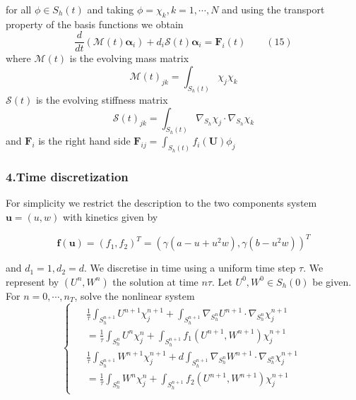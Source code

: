 \documentclass[notheorems,serif]{beamer}
\begin{document}
\begin{frame}
for all $\phi\in S_h(t)$ and taking $\phi=\chi_k, k=1,\cdots, N$ and using the transport property of the basis functions we obtain
\begin{equation*}
\frac{d}{dt}(\mathcal{M}(t)\boldsymbol{\alpha}_i)+d_i\mathcal{S}(t)\boldsymbol{\alpha}_i=\boldsymbol{F}_i(t)\qquad(15)
\end{equation*}
where $\mathcal{M}(t)$ is the evolving mass matrix
\begin{equation*}
\mathcal{M}(t)_{jk}=\int_{S_h(t)}\chi_j\chi_k
\end{equation*}
$\mathcal{S}(t)$ is the evolving stiffness matrix
\begin{equation*}
\mathcal{S}(t)_{jk}=\int_{S_h(t)}\nabla_{S_h}\chi_j\cdot\nabla_{S_h}\chi_k
\end{equation*}
and $\boldsymbol{F}_i$ is the right hand side $\boldsymbol{F}_{ij}=\int_{S_h(t)}f_i(\boldsymbol{U})\phi_j$
\end{frame}

\begin{frame}
\frametitle{\small 4.Time discretization}
For simplicity we restrict the description to the two components system $\boldsymbol{u}=(u, w)$ with kinetics given by 

\begin{equation*}
    \boldsymbol{f}(\boldsymbol{u})=(f_1, f_2)^T=\left(\gamma(a-u+u^2w),\gamma(b-u^2w)\right)^T
\end{equation*}

and $d_1=1, d_2=d$. We discretise in time using a uniform time step $\tau$. We represent by $(U^n, W^n)$ the solution at time $n\tau$. Let $U^0, W^0\in S_h(0)$ be given. For $n=0,\cdots,n_T$, solve the nonlinear system
\begin{equation*}
\begin{cases}
\begin{aligned}
&\frac{1}{\tau}\int_{S_h^{n+1}}U^{n+1}\chi_j^{n+1}+\int_{S_h^{n+1}}\nabla_{S_h^n}U^{n+1}\cdot\nabla_{S_h^n}\chi_j^{n+1}\\
&=\frac{1}{\tau}\int_{S_h^n}U^n \chi_j^n + \int_{S_h^{n+1}}f_1(U^{n+1}, W^{n+1})\chi_j^{n+1}\\
&\frac{1}{\tau}\int_{S_h^{n+1}}W^{n+1}\chi_j^{n+1}+d\int_{S_h^{n+1}}\nabla_{S_h^n}W^{n+1}\cdot\nabla_{S_h^n}\chi_j^{n+1}\\
&=\frac{1}{\tau}\int_{S_h^n}W^n\chi_j^n+\int_{S_h^{n+1}}f_2(U^{n+1}, W^{n+1})\chi_j^{n+1}
\end{aligned}
\end{cases}
\end{equation*}
\end{frame}
\end{document}
